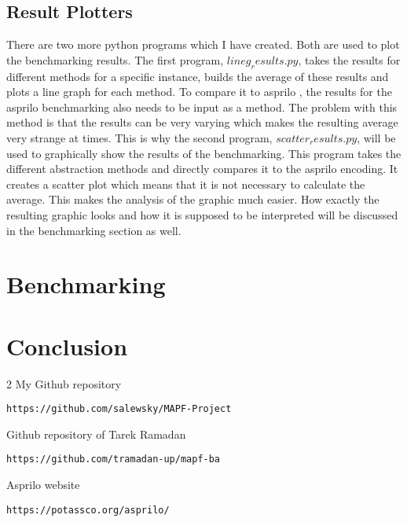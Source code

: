 \documentclass[runningheads]{llncs}
\begin{document}
\subsection{Result Plotters}
There are two more python programs which I have created. Both are used to plot the benchmarking results. The first program, $lineg_results.py$, takes the results for different methods for a specific instance, builds the average of these results and plots a line graph for each method. To compare it to asprilo , the results for the asprilo benchmarking also needs to be input as a method. The problem with this method is that the results can be very varying which makes the resulting average very strange at times. This is why the second program, $scatter_results.py$, will be used to graphically show the results of the benchmarking. This program takes the different abstraction methods and directly compares it to the asprilo encoding. It creates a scatter plot which means that it is not necessary to calculate the average. This makes the analysis of the graphic much easier. How exactly the resulting graphic looks and how it is supposed to be interpreted will be discussed in the benchmarking section as well.

\section{Benchmarking}

\section{Conclusion}

\newpage

\begin{thebibliography} {2}
My Github repository
\begin{verbatim}
https://github.com/salewsky/MAPF-Project
\end{verbatim}

Github repository of Tarek Ramadan
\begin{verbatim}
https://github.com/tramadan-up/mapf-ba
\end{verbatim}

Asprilo website
\begin{verbatim}
https://potassco.org/asprilo/
\end{verbatim}


\end{thebibliography}
\end{document}
